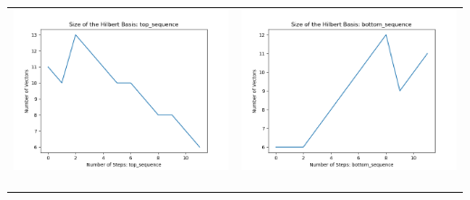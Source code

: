 \documentclass[10pt]{article}
\begin{document}
\begin{tabular}{c|c}
\begin{minipage}{.45\textwidth}
\includegraphics[width=\textwidth]{"DATA/4d/5 generators 2 bound E/top_sequence SIZE"}
\end{minipage} &
\begin{minipage}{.45\textwidth}
\includegraphics[width=\textwidth]{"DATA/4d/5 generators 2 bound E bottomup/bottom_sequence SIZE"}
\end{minipage} \\ \\
\hline \\\begin{minipage}{.45\textwidth}

\end{minipage}
\end{tabular}
\end{document}
